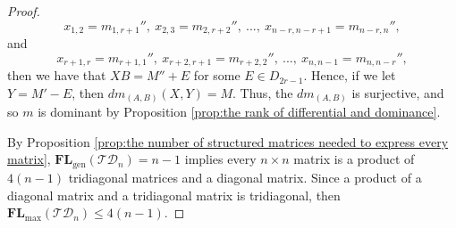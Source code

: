 \documentclass[reqno]{amsart}
\theoremstyle{definition}
\numberwithin{equation}{section}
\begin{document}
\begin{proof}
    \begin{equation*}
        x_{1,2}=m_{1,r+1}'',~ x_{2,3}=m_{2,r+2}'',~..., ~x_{n-r,n-r+1}=m_{n-r,n}'',
    \end{equation*}
    and 
    \begin{equation*}
        x_{r+1,r}=m_{r+1,1}'',~ x_{r+2,r+1}=m_{r+2,2}'',~...,~ x_{n,n-1}=m_{n,n-r}'',
    \end{equation*}
    then we have that $XB=M''+E$ for some $E \in D_{2r-1}$. Hence, if we let $Y=M'-E$, then $dm_{(A,B)}(X,Y)=M$. Thus, the $dm_{(A,B)}$ is surjective, and so $m$ is dominant by Proposition \ref{prop:the rank of differential and dominance}. 
    
    By Proposition \ref{prop:the number of structured matrices needed to express every matrix}, $\mathbf{FL}_{\text{gen}}(\mathcal{TD}_n)=n-1$ implies every $n \times n$ matrix is a product of $4(n-1)$ tridiagonal matrices and a diagonal matrix. Since a product of a diagonal matrix and a tridiagonal matrix is tridiagonal, then $\mathbf{FL}_{\text{max}}(\mathcal{TD}_n)\leq 4(n-1)$.
\end{proof}
\end{document}
